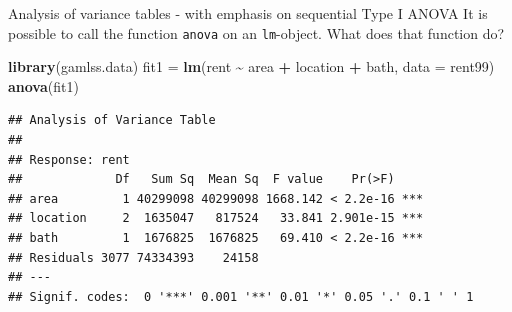 \documentclass[
  ignorenonframetext,
]{beamer}
\newenvironment{Shaded}{\begin{snugshade}}{\end{snugshade}}
\newcommand{\AttributeTok}[1]{\textcolor[rgb]{0.13,0.29,0.53}{#1}}
\newcommand{\FunctionTok}[1]{\textcolor[rgb]{0.13,0.29,0.53}{\textbf{#1}}}
\newcommand{\NormalTok}[1]{#1}
\newcommand{\OtherTok}[1]{\textcolor[rgb]{0.56,0.35,0.01}{#1}}
\newcommand{\SpecialCharTok}[1]{\textcolor[rgb]{0.81,0.36,0.00}{\textbf{#1}}}
\begin{document}
\begin{frame}[fragile]
\begin{block}{Analysis of variance tables - with emphasis on sequential
Type I ANOVA}
\label{analysis-of-variance-tables---with-emphasis-on-sequential-type-i-anova}
It is possible to call the function \texttt{anova} on an
\texttt{lm}-object. What does that function do?

\begin{Shaded}
\begin{Highlighting}[]
\FunctionTok{library}\NormalTok{(gamlss.data)}
\NormalTok{fit1 }\OtherTok{=} \FunctionTok{lm}\NormalTok{(rent }\SpecialCharTok{\textasciitilde{}}\NormalTok{ area }\SpecialCharTok{+}\NormalTok{ location }\SpecialCharTok{+}\NormalTok{ bath, }\AttributeTok{data =}\NormalTok{ rent99)}
\FunctionTok{anova}\NormalTok{(fit1)}
\end{Highlighting}
\end{Shaded}

\begin{verbatim}
## Analysis of Variance Table
## 
## Response: rent
##             Df   Sum Sq  Mean Sq  F value    Pr(>F)    
## area         1 40299098 40299098 1668.142 < 2.2e-16 ***
## location     2  1635047   817524   33.841 2.901e-15 ***
## bath         1  1676825  1676825   69.410 < 2.2e-16 ***
## Residuals 3077 74334393    24158                       
## ---
## Signif. codes:  0 '***' 0.001 '**' 0.01 '*' 0.05 '.' 0.1 ' ' 1
\end{verbatim}
\end{block}
\end{frame}
\end{document}
